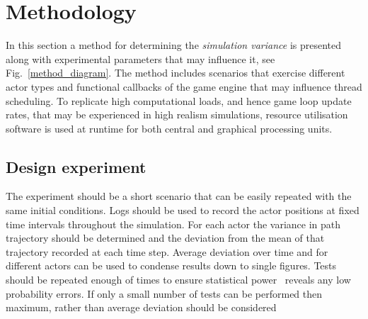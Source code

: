 \section{Methodology} \label{s:methodology}

In this section a method for determining the \textit{simulation variance} is presented along with experimental parameters that may influence it, see Fig.~\ref{method_diagram}. The method includes scenarios that exercise different actor types and functional callbacks of the game engine that may influence thread scheduling. To replicate high computational loads, and hence game loop update rates, that may be experienced in high realism simulations, resource utilisation software is used at runtime for both central and graphical processing units.

%

\subsection{Design experiment}
The experiment should be a short scenario that can be easily repeated with the same initial conditions. Logs should be used to record the actor positions at fixed time intervals throughout the simulation. For each actor the variance in path trajectory should be determined and the deviation from the mean of that trajectory recorded at each time step. Average deviation over time and for different actors can be used to condense results down to single figures. Tests should be repeated enough of times to ensure statistical power~\cite{cohen2013statistical} reveals any low probability errors. If only a small number of tests can be performed  then maximum, rather than average deviation should be considered 

